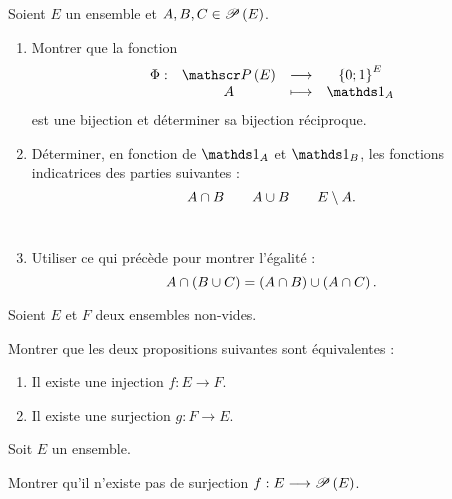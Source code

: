 \begin{exo}
Soient \(E\) un ensemble et \(A,B,C\in\P{E}\).

\begin{enumerate}
\item Montrer que la fonction \[\fonction{\Phi}{\P{E}}{\accol{0;1}^E}{A}{\ind{A}}\] est une bijection et déterminer sa bijection réciproque. \\

\item Déterminer, en fonction de \(\ind{A}\) et \(\ind{B}\), les fonctions indicatrices des parties suivantes : \[A\inter B\qquad A\union B\qquad E\excluant A.\] \\

\item Utiliser ce qui précède pour montrer l'égalité : \[A\inter\paren{B\union C}=\paren{A\inter B}\union\paren{A\inter C}.\]
\end{enumerate}
\end{exo}

\begin{corr}
\end{corr}

\begin{exo}
Soient \(E\) et \(F\) deux ensembles non-vides.

Montrer que les deux propositions suivantes sont équivalentes :

\begin{enumerate}
\item Il existe une injection \(f:E\to F\). \\

\item Il existe une surjection \(g:F\to E\).
\end{enumerate}
\end{exo}

\begin{corr}
\end{corr}

\begin{exo}
Soit \(E\) un ensemble.

Montrer qu'il n'existe pas de surjection \(f:E\to\P{E}\).
\end{exo}

\begin{corr}
\end{corr}

